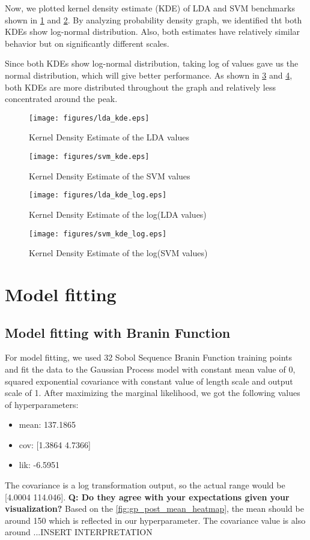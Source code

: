 \documentclass[11pt]{article}
\numberwithin{equation}{section}
\begin{document}
Now, we plotted kernel density estimate (KDE) of LDA and SVM benchmarks shown in \ref{fig:lda_kde} and \ref{fig:svm_kde}. By analyzing probability density graph, we identified tht both KDEs show log-normal distribution. Also, both estimates have relatively similar behavior but on significantly different scales.

Since both KDEs show log-normal distribution, taking log of values gave us the normal distribution, which will give better performance. As shown in \ref{fig:lda_kde_log} and \ref{fig:svm_kde_log}, both KDEs are more distributed throughout the graph and relatively less concentrated around the peak.

\begin{figure}[H]
  \centering
  \texttt{[image: figures/lda\_kde.eps]}
  \caption{Kernel Density Estimate of the LDA values}
  \label{fig:lda_kde}
\end{figure}
\begin{figure}[H]
  \centering
  \texttt{[image: figures/svm\_kde.eps]}
  \caption{Kernel Density Estimate of the SVM values}
  \label{fig:svm_kde}
\end{figure}

\begin{figure}[H]
  \centering
  \texttt{[image: figures/lda\_kde\_log.eps]}
  \caption{Kernel Density Estimate of the log(LDA values)}
  \label{fig:lda_kde_log}
\end{figure}
\begin{figure}[H]
  \centering
  \texttt{[image: figures/svm\_kde\_log.eps]}
  \caption{Kernel Density Estimate of the log(SVM values)}
  \label{fig:svm_kde_log}
\end{figure}

\section*{Model fitting}
\subsection*{Model fitting with Branin Function}
For model fitting, we used 32 Sobol Sequence Branin Function training points and fit the data to the Gaussian Process model with constant mean value of 0, squared exponential covariance with constant value of length scale and output scale of 1. After maximizing the marginal likelihood, we got the following values of hyperparameters:
\begin{itemize}
  \item
    mean: 137.1865
  \item
    cov: [1.3864 4.7366]
  \item
    lik: -6.5951
\end{itemize}
The covariance is a log transformation output, so the actual range would be [4.0004 114.046].
\textbf{Q: Do they agree with your expectations given your visualization?}
Based on the \ref{fig:gp_post_mean_heatmap}, the mean should be around 150 which is reflected in our hyperparameter. The covariance value is also around ...INSERT INTERPRETATION
\end{document}
